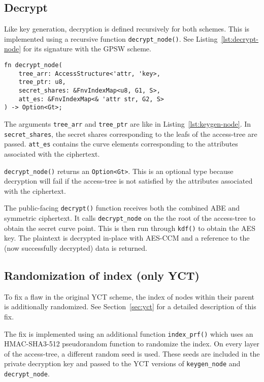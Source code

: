 \subsection{Decrypt}
Like key generation, decryption is defined recursively for both schemes.
This is implemented using a recursive function \verb+decrypt_node()+.
See Listing~\ref{lst:decrypt-node} for its signature with the GPSW scheme.

\begin{lstlisting}[float=h,caption={Function signature of recursive decryption},label={lst:decrypt-node}]
fn decrypt_node(
    tree_arr: AccessStructure<'attr, 'key>,
    tree_ptr: u8,
    secret_shares: &FnvIndexMap<u8, G1, S>,
    att_es: &FnvIndexMap<& 'attr str, G2, S>
) -> Option<Gt>;
\end{lstlisting}

The arguments \verb+tree_arr+ and \verb+tree_ptr+ are like in Listing~\ref{lst:keygen-node}.
In \verb+secret_shares+, the secret shares corresponding to the leafs of the \gls{access-tree} are passed.
\verb+att_es+ contains the curve elements corresponding to the attributes associated with the ciphertext.

\verb+decrypt_node()+ returns an \verb+Option<Gt>+.
This is an optional type because decryption will fail if the \gls{access-tree} is not satisfied by the attributes associated with the ciphertext.

The public-facing \verb+decrypt()+ function receives both the combined ABE and symmetric ciphertext. 
It calls \verb.decrypt_node. on the the root of the \gls{access-tree} to obtain the secret curve point.
This is then run through \verb+kdf()+ to obtain the AES key.
The plaintext is decrypted in-place with AES-CCM and a reference to the (now successfully decrypted) data is returned.

\subsection{Randomization of index (only YCT)}
To fix a flaw in the original YCT scheme, the index of nodes within their parent is additionally randomized.
See Section~\ref{sec:yct} for a detailed description of this fix.

The fix is implemented using an additional function \verb+index_prf()+ which uses an HMAC-SHA3-512 pseudorandom function to randomize the index.
On every layer of the \gls{access-tree}, a different random seed is used. 
These seeds are included in the private decryption key and passed to the YCT versions of \verb+keygen_node+ and \verb+decrypt_node+.

